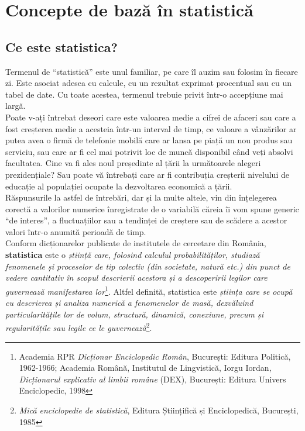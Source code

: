\documentclass[
  11pt,
  b5paper,
  nottoc]{book}
\begin{document}

\hypertarget{cap1}{%
\chapter{Concepte de bază în statistică}\label{cap1}}

\hypertarget{ce-este-statistica}{%
\section{Ce este statistica?}\label{ce-este-statistica}}

Termenul de ``statistică'' este unul familiar, pe care îl auzim sau
folosim în fiecare zi. Este asociat adesea cu calcule, cu un rezultat
exprimat procentual sau cu un tabel de date. Cu toate acestea, termenul
trebuie privit într-o accepțiune mai largă.\\
Poate v-ați întrebat deseori care este valoarea medie a cifrei de
afaceri sau care a fost creșterea medie a acesteia într-un interval de
timp, ce valoare a vânzărilor ar putea avea o firmă de telefonie mobilă
care ar lansa pe piață un nou produs sau serviciu, sau care ar fi cel
mai potrivit loc de muncă disponibil când veți absolvi facultatea. Cine
va fi ales noul președinte al țării la următoarele alegeri
prezidențiale? Sau poate vă întrebați care ar fi contribuția creșterii
nivelului de educație al populației ocupate la dezvoltarea economică a
țării.\\
Răspunsurile la astfel de întrebări, dar și la multe altele, vin din
înțelegerea corectă a valorilor numerice înregistrate de o variabilă
căreia îi vom spune generic ``de interes'', a fluctuațiilor sau a
tendinței de creștere sau de scădere a acestor valori într-o anumită
perioadă de timp.\\
Conform dicționarelor publicate de institutele de cercetare din România,
\textbf{statistica} este o \emph{știință care, folosind calculul
probabilităților, studiază fenomenele și proceselor de tip colectiv (din
societate, natură etc.) din punct de vedere cantitativ în scopul
descrierii acestora și a descoperirii legilor care guvernează
manifestarea lor}\footnote{Academia RPR \emph{Dicționar Enciclopedic
  Român}, București: Editura Politică, 1962-1966; Academia Română,
  Institutul de Lingvistică, Iorgu Iordan, \emph{Dicționarul explicativ
  al limbii române} (DEX), București: Editura Univers Enciclopedic, 1998}.
Altfel definită, statistica este \emph{știința care se ocupă cu
descrierea și analiza numerică a fenomenelor de masă, dezvăluind
particularitățile lor de volum, structură, dinamică, conexiune, precum
și regularitățile sau legile ce le guvernează}\footnote{\emph{Mică
  enciclopedie de statistică}, Editura Științifică și Enciclopedică,
  București, 1985}.\\
\end{document}

